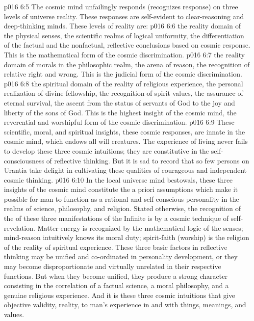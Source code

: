 \vs p016 6:5 The cosmic mind unfailingly responds (recognizes response) on three levels of universe reality. These responses are self\hyp{}evident to clear\hyp{}reasoning and deep\hyp{}thinking minds. These levels of reality are:
\vs p016 6:6 \bibnobreakspace {} the reality domain of the physical senses, the scientific realms of logical uniformity, the differentiation of the factual and the nonfactual, reflective conclusions based on cosmic response. This is the mathematical form of the cosmic discrimination.
\vs p016 6:7 \pc {}\bibnobreakspace {} the reality domain of morals in the philosophic realm, the arena of reason, the recognition of relative right and wrong. This is the judicial form of the cosmic discrimination.
\vs p016 6:8 \pc {}\bibnobreakspace {} the spiritual domain of the reality of religious experience, the personal realization of divine fellowship, the recognition of spirit values, the assurance of eternal survival, the ascent from the status of servants of God to the joy and liberty of the sons of God. This is the highest insight of the cosmic mind, the reverential and worshipful form of the cosmic discrimination.
\vs p016 6:9 \pc These scientific, moral, and spiritual insights, these cosmic responses, are innate in the cosmic mind, which endows all will creatures. The experience of living never fails to develop these three cosmic intuitions; they are constitutive in the self\hyp{}consciousness of reflective thinking. But it is sad to record that so few persons on Urantia take delight in cultivating these qualities of courageous and independent cosmic thinking.
\vs p016 6:10 \pc In the local universe mind bestowals, these three insights of the cosmic mind constitute the a priori assumptions which make it possible for man to function as a rational and self\hyp{}conscious personality in the realms of science, philosophy, and religion. Stated otherwise, the recognition of the  of these three manifestations of the Infinite is by a cosmic technique of self\hyp{}revelation. Matter\hyp{}energy is recognized by the mathematical logic of the senses; mind\hyp{}reason intuitively knows its moral duty; spirit\hyp{}faith (worship) is the religion of the reality of spiritual experience. These three basic factors in reflective thinking may be unified and co\hyp{}ordinated in personality development, or they may become disproportionate and virtually unrelated in their respective functions. But when they become unified, they produce a strong character consisting in the correlation of a factual science, a moral philosophy, and a genuine religious experience. And it is these three cosmic intuitions that give objective validity, reality, to man’s experience in and with things, meanings, and values.
